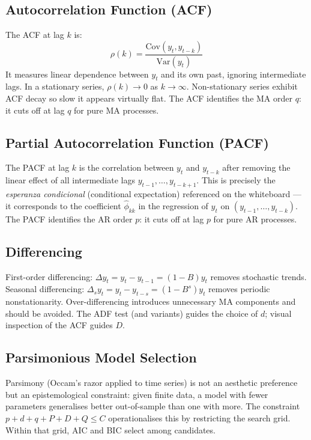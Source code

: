 \documentclass[12pt,a4paper]{article}
\begin{document}
\subsection{Autocorrelation Function (ACF)}

The ACF at lag $k$ is:
\[
    \rho(k) = \frac{\text{Cov}(y_t, y_{t-k})}{\text{Var}(y_t)}
\]
It measures linear dependence between $y_t$ and its own past, ignoring
intermediate lags. In a stationary series, $\rho(k)\to 0$ as $k\to\infty$.
Non-stationary series exhibit ACF decay so slow it appears virtually flat.
The ACF identifies the MA order $q$: it cuts off at lag $q$ for pure MA processes.

\subsection{Partial Autocorrelation Function (PACF)}

The PACF at lag $k$ is the correlation between $y_t$ and $y_{t-k}$ after
removing the linear effect of all intermediate lags $y_{t-1},\dots,y_{t-k+1}$.
This is precisely the \textit{esperanza condicional} (conditional expectation)
referenced on the whiteboard — it corresponds to the coefficient $\hat{\phi}_{kk}$
in the regression of $y_t$ on $(y_{t-1},\dots,y_{t-k})$. The PACF identifies
the AR order $p$: it cuts off at lag $p$ for pure AR processes.

\subsection{Differencing}

First-order differencing: $\Delta y_t = y_t - y_{t-1} = (1-B)y_t$ removes
stochastic trends. Seasonal differencing: $\Delta_s y_t = y_t - y_{t-s} = (1-B^s)y_t$
removes periodic nonstationarity. Over-differencing introduces unnecessary
MA components and should be avoided. The ADF test (and variants) guides the
choice of $d$; visual inspection of the ACF guides $D$.

\subsection{Parsimonious Model Selection}

Parsimony (Occam's razor applied to time series) is not an aesthetic preference
but an epistemological constraint: given finite data, a model with fewer
parameters generalises better out-of-sample than one with more. The constraint
$p+d+q+P+D+Q\le C$ operationalises this by restricting the search grid.
Within that grid, AIC and BIC select among candidates.
\end{document}
